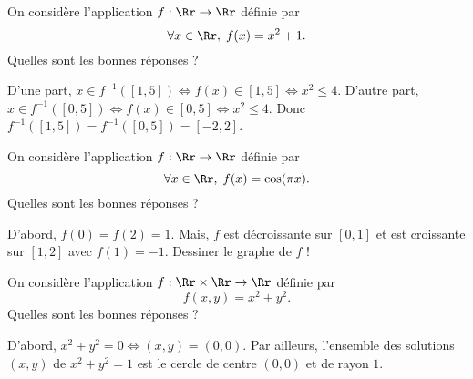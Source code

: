 \begin{question}

On considère l'application $f:\Rr\to \Rr$ définie par
$$\forall x\in \Rr,\; f(x)=x^2+1.$$
Quelles sont les bonnes réponses ?
\begin{answers}  
\end{answers}
\begin{explanations}
D'une part, $x\in f^{-1}([1,5])\Leftrightarrow f(x)\in [1,5]\Leftrightarrow x^2\leq 4$. D'autre part, $x\in f^{-1}([0,5])\Leftrightarrow f(x)\in [0,5]\Leftrightarrow x^2\leq 4$. Donc $f^{-1}([1,5])=f^{-1}([0,5])=[-2,2]$.
\end{explanations}
\end{question}


\begin{question}

On considère l'application $f:\Rr\to \Rr$ définie par
$$\forall x\in \Rr,\; f(x)=\cos (\pi x).$$
Quelles sont les bonnes réponses ?
\begin{answers}  
\end{answers}
\begin{explanations}
D'abord, $f(0)=f(2)=1$. Mais, $f$ est décroissante sur $[0,1]$ et est croissante sur $[1,2]$ avec $f(1)=-1$. Dessiner le graphe de $f$ !
\end{explanations}
\end{question}


\begin{question}

On considère l'application $f:\Rr\times \Rr\to \Rr$ définie par
$$f(x,y)=x^2+y^2.$$
Quelles sont les bonnes réponses ?
\begin{answers}  
\end{answers}
\begin{explanations}
D'abord, $x^2+y^2=0\Leftrightarrow (x,y)=(0,0)$. Par ailleurs, l'ensemble des solutions $(x,y)$ de $x^2+y^2=1$ est le cercle de centre $(0,0)$ et de rayon $1$.
\end{explanations}
\end{question}


